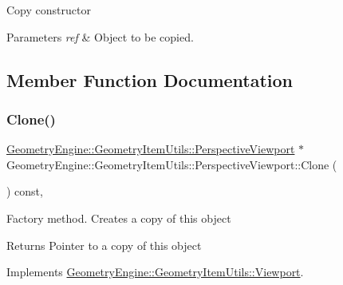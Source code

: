 Copy constructor 
\begin{DoxyParams}{Parameters}
{\em ref} & Object to be copied. \\
\hline
\end{DoxyParams}


\subsection{Member Function Documentation}
\mbox{\label{class_geometry_engine_1_1_geometry_item_utils_1_1_perspective_viewport_a828a22e5d39e7c8d1812e97f582bf667}} 
\subsubsection{\texorpdfstring{Clone()}{Clone()}}
{\footnotesize\ttfamily \mbox{\hyperlink{class_geometry_engine_1_1_geometry_item_utils_1_1_perspective_viewport}{Geometry\+Engine\+::\+Geometry\+Item\+Utils\+::\+Perspective\+Viewport}} $\ast$ Geometry\+Engine\+::\+Geometry\+Item\+Utils\+::\+Perspective\+Viewport\+::\+Clone (\begin{DoxyParamCaption}{ }\end{DoxyParamCaption}) const\hspace{0.3cm}{\ttfamily [override]}, {\ttfamily [virtual]}}

Factory method. Creates a copy of this object \begin{DoxyReturn}{Returns}
Pointer to a copy of this object 
\end{DoxyReturn}


Implements \mbox{\hyperlink{class_geometry_engine_1_1_geometry_item_utils_1_1_viewport_a8bd47866a001eae03f88df67fd699904}{Geometry\+Engine\+::\+Geometry\+Item\+Utils\+::\+Viewport}}.

\mbox{\label{class_geometry_engine_1_1_geometry_item_utils_1_1_perspective_viewport_af751fd63329fb5f80965e3f864afb4b7}} 
